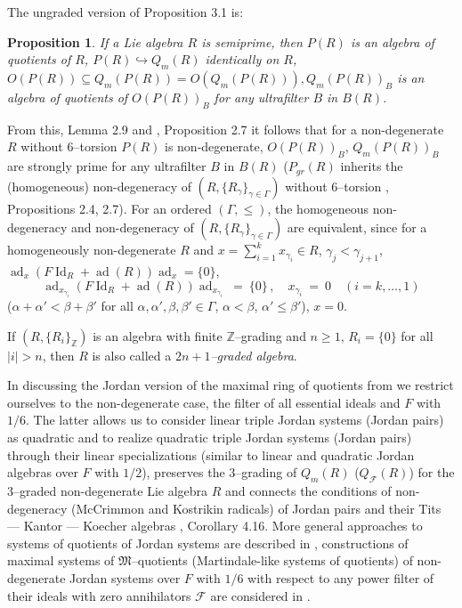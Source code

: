 \documentclass[a4paper,11pt]{article}
\newtheorem{prop}[defi]{Proposition}
\DeclareMathOperator{\ad}{ad}
\DeclareMathOperator{\Id}{Id}
\begin{document}
The ungraded version of Proposition 3.1 is: 

\begin{prop}
If a Lie algebra $R$ is semiprime, then $P(R)$ is an algebra of quotients of 
$R$, ${P(R)\hookrightarrow Q_m(R)}$ identically on $R$, 
${O(P(R))\subseteq Q_m(P(R))=O(Q_m(P(R))), Q_m(P(R))_B}$ is an algebra of 
quotients of $O(P(R))_B$ for any ultrafilter $B$ in $B(R)$.
\end{prop}

From this, Lemma 2.9 and \cite{Mol}, Proposition 2.7 it follows that for a 
non-degenerate $R$ without $6$--torsion $P(R)$ is non-degenerate, $O(P(R))_B$, 
$Q_m(P(R))_B$ are strongly prime for any ultrafilter $B$ in $B(R)$ 
($P_{gr}(R)$ inherits the (homogeneous) non-degeneracy of 
${(R, \{R_{\gamma}\}_{\gamma\in \Gamma})}$ without $6$--torsion 
\cite{OMol}, Propositions 2.4, 2.7). For an ordered 
${(\Gamma, \leq)}$, the homogeneous non-degeneracy and non-degeneracy of 
${(R, \{R_{\gamma}\}_{\gamma\in \Gamma})}$ are equivalent, since for a 
homogeneously non-degenerate $R$ and ${x=\sum\limits_{i=1}^k x_{\gamma_i}\in R}$, 
${\gamma_j< \gamma_{j+1}}$, ${\ad_x (F \Id_R+\ad(R)) \ad_x=\{0\}}$, 
\[
\ad_{x_{\gamma_i}} (F \Id_R+\ad(R)) \ad_{x_{\gamma_i}}\ =\ \{0\}\,,\quad 
x_{\gamma_i}\ =\ 0\quad (i=k,\ldots, 1)
\]
(${\alpha+\alpha'< \beta+\beta'}$ for all ${\alpha, \alpha', \beta, \beta'\in 
\Gamma}$, ${\alpha< \beta}$, ${\alpha'\leq \beta'}$), ${x=0}$. 

If ${(R, \{R_i\}_{\mathbb{Z}})}$ is an algebra with finite 
$\mathbb{Z}$--grading and ${n\geq 1}$, ${R_i=\{0\}}$ for all ${|i|> n}$, 
then $R$ is also called a \emph{${2 n+1}$--graded algebra}.

In discussing the Jordan version of the maximal ring of quotients from 
\cite{JMQ, OMol} we restrict ourselves to the non-degenerate case, the 
filter of all essential ideals and $F$ with $1/6$. The latter allows us to 
consider linear triple Jordan systems (Jordan pairs) as quadratic and to 
realize quadratic triple Jordan systems (Jordan pairs) through their linear 
specializations (similar to linear and quadratic Jordan algebras over 
$F$ with $1/2$), preserves the $3$--grading of $Q_m(R)$ ($Q_{\mathcal{F}}(R)$) 
for the $3$--graded non-degenerate Lie algebra $R$ and connects the 
conditions of non-degeneracy (McCrimmon and Kostrikin radicals) of Jordan pairs 
and their Tits --- Kantor --- Koecher algebras \cite{Gol6}, Corollary 4.16. 
More general approaches to systems of quotients of Jordan systems are 
described in \cite{Mont, AMc}, constructions of maximal systems of 
$\mathfrak{M}$--quotients (Martindale-like systems of quotients) of 
non-degenerate Jordan systems over $F$ with $1/6$ with respect to any power 
filter of their ideals with zero annihilators $\mathcal{F}$ are considered 
in \cite{JMQ}. 
\end{document}
